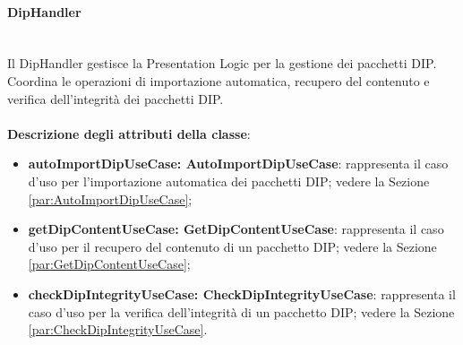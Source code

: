 \documentclass[a4paper,12pt]{article}
\begin{document}
{{{                \paragraph{DipHandler}\label{par:DipHandler}\mbox{}\\
                Il DipHandler gestisce la Presentation Logic per la gestione dei pacchetti DIP. Coordina le operazioni di importazione automatica, recupero del contenuto e verifica dell'integrità dei pacchetti DIP.\\
                \\
                \textbf{Descrizione degli attributi della classe}:
                \begin{itemize}
                    \item \textbf{autoImportDipUseCase: AutoImportDipUseCase}: rappresenta il caso d'uso per l'importazione automatica dei pacchetti DIP; vedere la Sezione \ref{par:AutoImportDipUseCase};
                    \item \textbf{getDipContentUseCase: GetDipContentUseCase}: rappresenta il caso d'uso per il recupero del contenuto di un pacchetto DIP; vedere la Sezione \ref{par:GetDipContentUseCase};
                    \item \textbf{checkDipIntegrityUseCase: CheckDipIntegrityUseCase}: rappresenta il caso d'uso per la verifica dell'integrità di un pacchetto DIP; vedere la Sezione \ref{par:CheckDipIntegrityUseCase}.
                \end{itemize}
                
}}}
\end{document}
